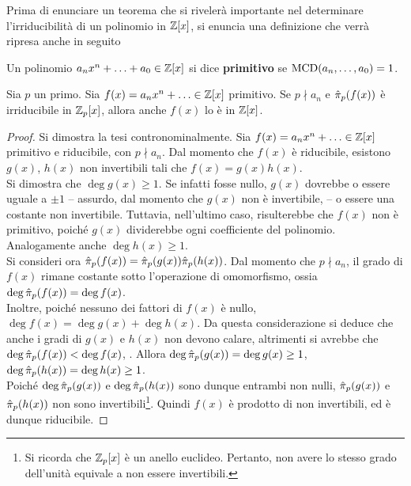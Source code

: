 \documentclass[11pt]{scrbook}
\begin{document}
Prima di enunciare un teorema che si rivelerà
importante nel determinare l'irriducibilità di un
polinomio in $\mathbb{Z}[x]$, si enuncia una definizione che
verrà ripresa anche in seguito

\begin{definition}
    Un polinomio $a_n x^n + \ldots + a_0 \in \mathbb{Z}[x]$ si dice
    \textbf{primitivo} se $\operatorname{MCD}(a_n, \ldots, a_0)=1$.
\end{definition}

\begin{theorem}
    \label{th:proiezione_irriducibilità}
    Sia $p$ un primo. Sia $f(x) = a_n x^n + \ldots \in \mathbb{Z}[x]$
    primitivo. Se $p \nmid a_n$ e
    $\hat{\pi}_p(f(x))$ è irriducibile in $\mathbb{Z}_p[x]$, allora anche $f(x)$ lo
    è in $\mathbb{Z}[x]$.
\end{theorem}

\begin{proof}
    Si dimostra la tesi contronominalmente. Sia $f(x) =
        a_nx^n + \ldots \in \mathbb Z[x]$ primitivo e riducibile, con
    $p \nmid a_n$. Dal momento che $f(x)$ è riducibile, esistono
    $g(x)$, $h(x)$ non invertibili tali che $f(x)=g(x)h(x)$. \\

    Si dimostra che $\deg g(x) \geq 1$. Se infatti fosse nullo,
    $g(x)$ dovrebbe o essere uguale a $\pm 1$ -- assurdo, dal
    momento che $g(x)$ non è invertibile, \Lightning{} -- o
    essere una costante non invertibile. Tuttavia, nell'ultimo
    caso, risulterebbe che $f(x)$ non è primitivo, poiché
    $g(x)$ dividerebbe ogni coefficiente del polinomio.
    Analogamente anche $\deg h(x) \geq 1$. \\

    Si consideri ora $\hat{\pi}_p(f(x))=\hat{\pi}_p(g(x))\hat{\pi}_p(h(x))$.
    Dal momento che $p \nmid a_n$, il grado di $f(x)$ rimane costante
    sotto l'operazione di omomorfismo, ossia $\deg \hat{\pi}_p(f(x)) =
        \deg f(x)$. \\

    Inoltre, poiché nessuno dei fattori di $f(x)$ è nullo, $\deg f(x) = \deg g(x) +
        \deg h(x)$. Da questa considerazione si deduce che anche i
    gradi di $g(x)$ e $h(x)$ non devono calare, altrimenti si
    avrebbe che $\deg \hat{\pi}_p(f(x)) < \deg f(x)$, \Lightning{}.
    Allora $\deg \hat{\pi}_p(g(x)) = \deg g(x) \geq 1$,
    $\deg \hat{\pi}_p(h(x)) = \deg h(x) \geq 1$. \\

    Poiché $\deg \hat{\pi}_p(g(x))$ e $\deg \hat{\pi}_p(h(x))$ sono
    dunque entrambi non nulli, $\hat{\pi}_p(g(x))$ e $\hat{\pi}_p(h(x))$
    non sono invertibili\footnote{Si ricorda che $\mathbb{Z}_p[x]$
        è un anello euclideo. Pertanto, non avere lo stesso grado
        dell'unità equivale a non essere invertibili.}. Quindi
    $f(x)$ è prodotto di non invertibili, ed è dunque riducibile.

\end{proof}
\end{document}
